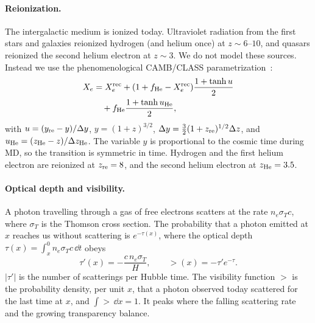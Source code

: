 \paragraph*{Reionization.} The intergalactic medium is ionized today. Ultraviolet radiation from the first stars and
galaxies reionized hydrogen (and helium once) at $z\sim6$--$10$, and quasars reionized the second helium electron at
$z\sim3$. We do not model these sources. Instead we use the phenomenological CAMB/CLASS parametrization~\cite{Lewis2008}:
\begin{align}
X_e &= X_e^{\rm rec} + (1+f_{\rm He}-X_e^{\rm rec})\frac{1+\tanh u}{2} \nonumber\\
    &\quad + f_{\rm He}\frac{1+\tanh u_{\rm He}}{2},
\end{align}
with $u=(y_{\rm re}-y)/\Delta y$, $y=(1+z)^{3/2}$, $\Delta y=\tfrac32(1+z_{\rm re})^{1/2}\Delta z$, and
$u_{\rm He}=(z_{\rm He}-z)/\Delta z_{\rm He}$. The variable $y$ is proportional to the cosmic time during MD, so the
transition is symmetric in time. Hydrogen and the first helium electron are reionized at $z_{\rm re}=8$, and the second
helium electron at $z_{\rm He}=3.5$.

\paragraph*{Optical depth and visibility.} A photon travelling through a gas of free electrons scatters at the rate
$n_e\sigma_Tc$, where $\sigma_T$ is the Thomson cross section. The probability that a photon emitted at $x$ reaches
us without scattering is $e^{-\tau(x)}$, where the optical depth $\tau(x)=\int_x^0 n_e\sigma_Tc\,\dd t$ obeys
\begin{equation}
\tau'(x) = -\frac{c\,n_e\sigma_T}{H},\qquad \gt(x) = -\tau'e^{-\tau}.
\end{equation}
$|\tau'|$ is the number of scatterings per Hubble time. The visibility function $\gt$ is the probability density, per
unit $x$, that a photon observed today scattered for the last time at $x$, and $\int\gt\,\dd x=1$. It peaks where the
falling scattering rate and the growing transparency balance.

